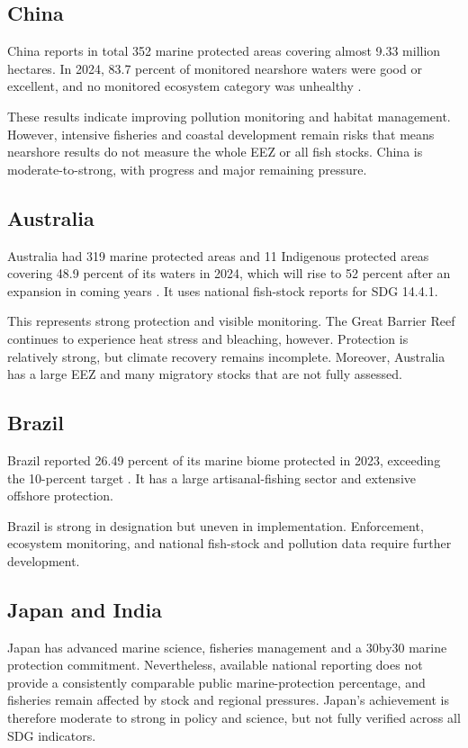 \documentclass[12pt,letterpaper]{article}
\begin{document}
\subsection{China}
China reports in total 352 marine protected areas covering almost 9.33 million hectares. In 2024, 83.7 percent of monitored nearshore waters were good or excellent, and no monitored ecosystem category was unhealthy \parencite{china2024,china2025}.

These results indicate improving pollution monitoring and habitat management. However, intensive fisheries and coastal development remain risks that means nearshore results do not measure the whole EEZ or all fish stocks. China is moderate-to-strong, with progress and major remaining pressure.

\subsection{Australia}
Australia had 319 marine protected areas and 11 Indigenous protected areas covering 48.9 percent of its waters in 2024, which will rise to 52 percent after an expansion in coming years \parencite{dcceew2024,dcceew2025}. It uses national fish-stock reports for SDG 14.4.1.

This represents strong protection and visible monitoring. The Great Barrier Reef continues to experience heat stress and bleaching, however. Protection is relatively strong, but climate recovery remains incomplete. Moreover, Australia has a large EEZ and many migratory stocks that are not fully assessed.

\subsection{Brazil}
Brazil reported 26.49 percent of its marine biome protected in 2023, exceeding the 10-percent target \parencite{ipea2024}. It has a large artisanal-fishing sector and extensive offshore protection.

Brazil is strong in designation but uneven in implementation. Enforcement, ecosystem monitoring, and national fish-stock and pollution data require further development.

\subsection{Japan and India}
Japan has advanced marine science, fisheries management and a 30by30 marine protection commitment. Nevertheless, available national reporting does not provide a consistently comparable public marine-protection percentage, and fisheries remain affected by stock and regional pressures.
Japan's achievement is therefore moderate to strong in policy and science, but not fully verified across all SDG indicators.
\end{document}

